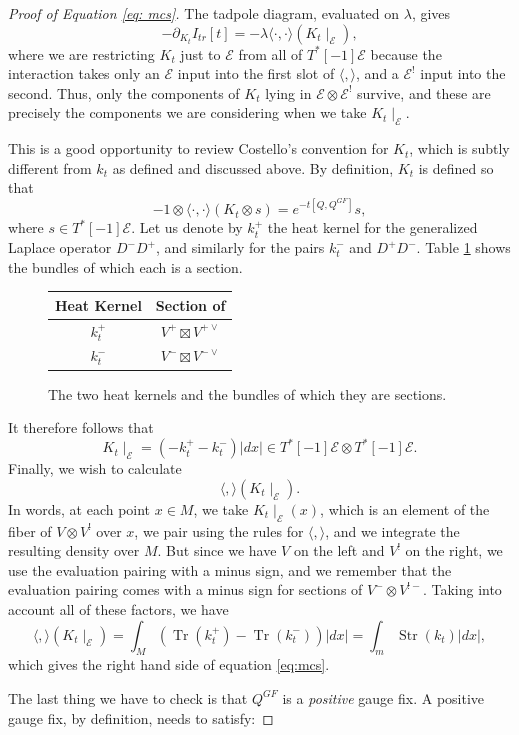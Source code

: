 \documentclass[11pt]{amsart}
\newcommand{\E}{\mscr{E}}
\newcommand{\mscr}{\mathscr}
\DeclareMathOperator{\Tr}{Tr} \DeclareMathOperator{\Cyc}{Cyc}
\numberwithin{equation}{section}
\newcommand\Str{\operatorname{Str}}
\begin{document}
\begin{proof}[Proof of Equation \ref{eq: mcs}]
The tadpole diagram, evaluated on $\lambda$, gives 
\[
-\partial_{K_t}I_{tr}[t] = -\lambda\langle\cdot, \cdot \rangle (K_t\mid_\E),
\]
where we are restricting $K_t$ just to $\E$ from all of $T^*[-1]\E$ because the interaction takes only an $\E$ input into the first slot of $\langle, \rangle$, and a $\E^!$ input into the second. Thus, only the components of $K_t$ lying in $\E\otimes \E^!$ survive, and these are precisely the components we are considering when we take $K_t\mid_\E$. 

This is a good opportunity to review Costello's convention for $K_t$, which is subtly different from $k_t$ as defined and discussed above. By definition, $K_t$ is defined so that 
\[
-1\otimes \langle \cdot, \cdot \rangle(K_t\otimes s) = e^{-t[Q,Q^{GF}]}s,
\]
where $s\in T^*[-1]\E$. Let us denote by $k_t^+$ the heat kernel for the generalized Laplace operator $D^-D^+$, and similarly for the pairs $k_t^-$  and $D^+D^-$. Table \ref{tab: kernels} shows the bundles of which each is a section.
\begin{figure}[h]
\label{tab: kernels}
\begin{tabular}{c|c}
Heat Kernel & Section of \\
\hline\noalign{\smallskip}
$k_t^+$ & $V^+ \boxtimes V^{+\vee}$\\
$k_t^-$ & $V^- \boxtimes V^{-\vee}$
\end{tabular}
\caption{The two heat kernels and the bundles of which they are sections.}
\end{figure}
It therefore follows that 
\[
K_t\mid_\E = (-k_t^+-k_t^-)|dx| \in T^*[-1]\E \otimes T^*[-1]\E.
\] 
Finally, we wish to calculate
\[
\langle ,\rangle (K_t\mid_\E).
\]
In words, at each point $x\in M$, we take $K_t\mid_\E(x)$, which is an element of the fiber of $V\otimes V^!$ over $x$, we pair using the rules for $\langle , \rangle$, and we integrate the resulting density over $M$. But since we have $V$ on the left and $V^!$ on the right, we use the evaluation pairing with a minus sign, and we remember that the evaluation pairing comes with a minus sign for sections of $V^-\otimes V^{!-}$. Taking into account all of these factors, we have
\[
\langle ,\rangle (K_t\mid_\E)= \int_M \left(\Tr(k_t^+)-\Tr(k_t^-)\right)|dx| = \int_m \Str(k_t)|dx|,
\] 
which gives the right hand side of equation \ref{eq:mcs}.

The last thing we have to check is that $Q^{GF}$ is a \textit{positive} gauge fix. A positive gauge fix, by definition, needs to satisfy:


\end{proof}
\end{document}
